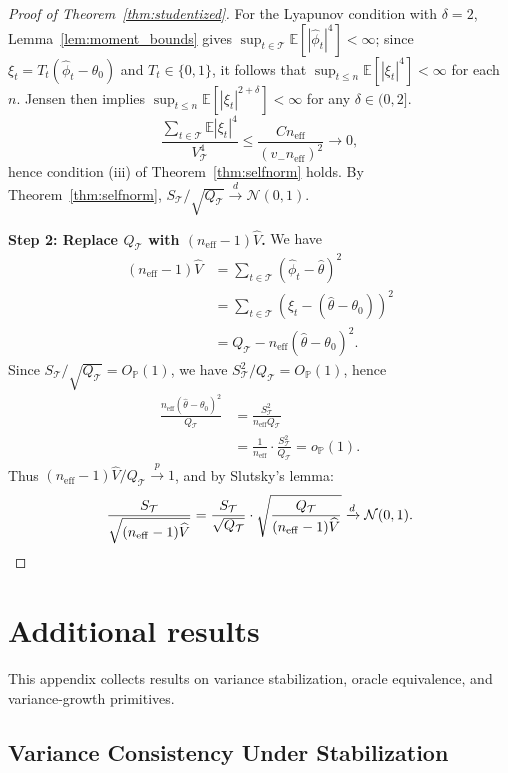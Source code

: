 \documentclass[11pt]{article}
\numberwithin{equation}{section}
\theoremstyle{plain}
\theoremstyle{definition}
\theoremstyle{remark}
\newcommand{\E}{\mathbb{E}}
\newcommand{\Pp}{\mathbb{P}}
\newcommand{\pto}{\xrightarrow{p}}
\newcommand{\dto}{\xrightarrow{d}}
\begin{document}
\begin{proof}[Proof of Theorem~\ref{thm:studentized}]
For the Lyapunov condition with $\delta=2$, Lemma~\ref{lem:moment_bounds} gives $\sup_{t\in\mathcal{T}}\E[|\widehat\phi_t|^4]<\infty$; since $\xi_t=T_t(\widehat\phi_t-\theta_0)$ and $T_t\in\{0,1\}$, it follows that $\sup_{t\le n}\E[|\xi_t|^4]<\infty$ for each $n$. Jensen then implies $\sup_{t\le n}\E[|\xi_t|^{2+\delta}]<\infty$ for any $\delta\in(0,2]$.
\[
\frac{\sum_{t\in\mathcal{T}}\E|\xi_t|^4}{V_{\mathcal{T}}^4}
\le \frac{C n_{\mathrm{eff}}}{(v_- n_{\mathrm{eff}})^2}\to 0,
\]
hence condition (iii) of Theorem~\ref{thm:selfnorm} holds.
By Theorem~\ref{thm:selfnorm}, $S_{\mathcal{T}}/\sqrt{Q_{\mathcal{T}}} \dto \mathcal{N}(0,1)$.

\medskip\noindent\textbf{Step 2: Replace $Q_{\mathcal{T}}$ with $(n_{\mathrm{eff}}-1)\widehat{V}$.}
We have
\begin{align*}
(n_{\mathrm{eff}}-1)\widehat V
&= \sum_{t\in\mathcal{T}} (\widehat{\phi}_t - \widehat\theta)^2\\
&= \sum_{t\in\mathcal{T}} (\xi_t - (\widehat\theta - \theta_0))^2\\
&= Q_{\mathcal{T}} - n_{\mathrm{eff}}(\widehat\theta - \theta_0)^2.
\end{align*}
Since $S_{\mathcal{T}}/\sqrt{Q_{\mathcal{T}}} = O_\Pp(1)$, we have $S_{\mathcal{T}}^2/Q_{\mathcal{T}} = O_\Pp(1)$, hence
\begin{align*}
\frac{n_{\mathrm{eff}}(\widehat\theta - \theta_0)^2}{Q_{\mathcal{T}}}
&= \frac{S_{\mathcal{T}}^2}{n_{\mathrm{eff}} Q_{\mathcal{T}}}\\
&= \frac{1}{n_{\mathrm{eff}}} \cdot \frac{S_{\mathcal{T}}^2}{Q_{\mathcal{T}}}
= o_\Pp(1).
\end{align*}
Thus $(n_{\mathrm{eff}}-1)\widehat V/Q_{\mathcal{T}} \pto 1$, and by Slutsky's lemma:
\[
\frac{S_{\mathcal{T}}}{\sqrt{(n_{\mathrm{eff}}-1)\widehat V}} = \frac{S_{\mathcal{T}}}{\sqrt{Q_{\mathcal{T}}}} \cdot \sqrt{\frac{Q_{\mathcal{T}}}{(n_{\mathrm{eff}}-1)\widehat V}} \dto \mathcal{N}(0,1). \qedhere
\]
\end{proof}

\section{Additional results}\label{app:additional_results}

This appendix collects results on variance stabilization, oracle equivalence,
and variance-growth primitives.

\subsection{Variance Consistency Under Stabilization}\label{sec:variance_stab}
\end{document}
